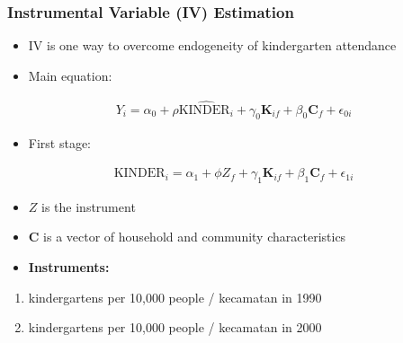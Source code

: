 \documentclass{beamer}
\begin{document}
\begin{frame}
\frametitle{Instrumental Variable (IV) Estimation}
\begin{itemize} 
	\item IV is one way to overcome endogeneity of kindergarten attendance
\end{itemize}
\vspace{0.1in}
\begin{itemize}
	\item[] Main equation:
\end{itemize}
\vspace{-0.1in}
\begin{gather}
Y_i = \alpha_0 + \rho \hat{\text{KINDER}_i} + \gamma_0 \mathbf{K}_{if} + \beta_0 \mathbf{C}_{f} + \epsilon_{0i}
\end{gather}
\vspace{-0.2in}
\begin{itemize}
	\item[] First stage:
\end{itemize}
\vspace{-0.1in}
\begin{gather}
\text{KINDER}_i = \alpha_1 + \phi Z_f + \gamma_1 \mathbf{K}_{if} + \beta_1 \mathbf{C}_{f} + \epsilon_{1i}
\end{gather}
\vspace{-0.2in}
{\footnotesize \begin{itemize}
	\item $Z$ is the instrument
	\item $\mathbf{C}$ is a vector of household and community characteristics
\end{itemize} }
\vspace{0.1in}
\begin{itemize}
	\item[] \textbf{Instruments:}
\end{itemize}
\vspace{-0.05in}
\begin{enumerate}
	\item kindergartens per 10,000 people / kecamatan in 1990
	\item kindergartens per 10,000 people / kecamatan in 2000
\end{enumerate}
\end{frame}
\end{document}
